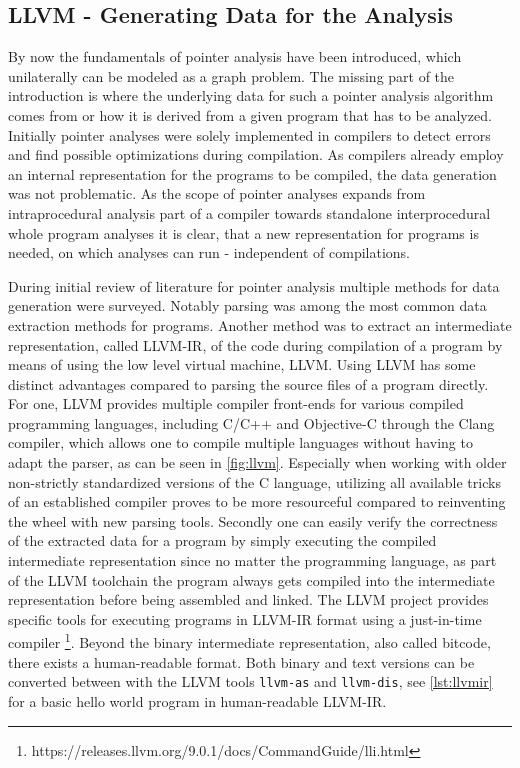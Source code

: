 \subsection{LLVM - Generating Data for the Analysis}
By now the fundamentals of pointer analysis have been introduced, which unilaterally can be modeled as a graph problem.
The missing part of the introduction is where the underlying data for such a pointer analysis algorithm comes from or how it is derived from a given program that has to be analyzed.
Initially pointer analyses were solely implemented in compilers to detect errors and find possible optimizations during compilation. As compilers already employ an internal representation for the programs to be compiled, the data generation was not problematic.
As the scope of pointer analyses expands from intraprocedural analysis part of a compiler towards standalone interprocedural whole program analyses it is clear, that a new representation for programs is needed, on which analyses can run - independent of compilations.

During initial review of literature for pointer analysis multiple methods for data generation were surveyed. Notably parsing was among the most common data extraction methods for programs. Another method was to extract an intermediate representation, called LLVM-IR, of the code during compilation of a program by means of using the low level virtual machine, LLVM. Using LLVM has some distinct advantages compared to parsing the source files of a program directly.
For one, LLVM provides multiple compiler front-ends for various compiled programming languages, including C/C++ and Objective-C through the Clang compiler, which allows one to compile multiple languages without having to adapt the parser, as can be seen in \autoref{fig:llvm}.
Especially when working with older non-strictly standardized versions of the C language, utilizing all available tricks of an established compiler proves to be more resourceful compared to reinventing the wheel with new parsing tools.
Secondly one can easily verify the correctness of the extracted data for a program by simply executing the compiled intermediate representation since no matter the programming language, as part of the LLVM toolchain the program always gets compiled into the intermediate representation before being assembled and linked. The LLVM project provides specific tools for executing programs in LLVM-IR format using a just-in-time compiler \footnote{https://releases.llvm.org/9.0.1/docs/CommandGuide/lli.html}. Beyond the binary intermediate representation, also called bitcode, there exists a human-readable format. Both binary and text versions can be converted between with the LLVM tools \verb|llvm-as| and \verb|llvm-dis|, see \autoref{lst:llvmir} for a basic hello world program in human-readable LLVM-IR.


